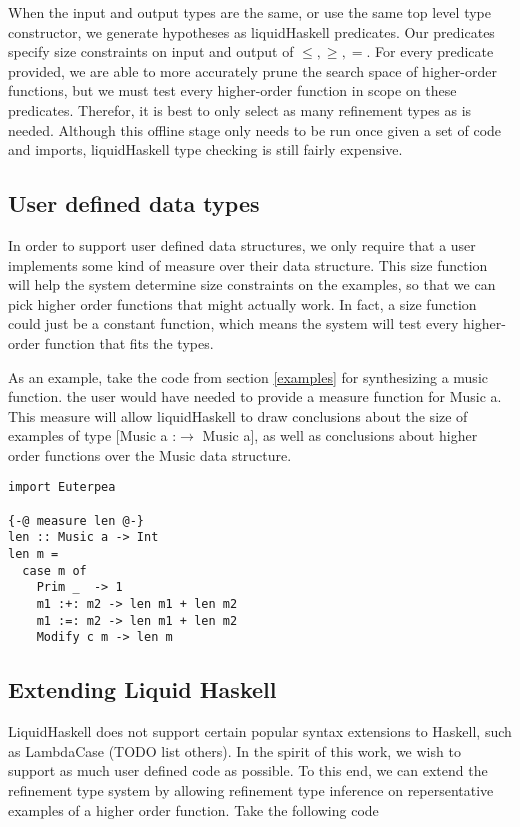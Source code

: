 When the input and output types are the same, or use the same top level type constructor, we generate hypotheses as liquidHaskell predicates.
Our predicates specify size constraints on input and output of $\leq,\geq,=$.
For every predicate provided, we are able to more accurately prune the search space of higher-order functions, but we must test every higher-order function in scope on these predicates. 
Therefor, it is best to only select as many refinement types as is needed.
Although this offline stage only needs to be run once given a set of code and imports, liquidHaskell type checking is still fairly expensive.



\subsection{User defined data types}
In order to support user defined data structures, we only require that a user implements some kind of measure\cite{realWorldLiquid} over their data structure.
This size function will help the system determine size constraints on the examples, so that we can pick higher order functions that might actually work.
In fact, a size function could just be a constant function, which means the system will test every higher-order function that fits the types. 

As an example, take the code from section \ref{examples} for synthesizing a music function.
the user would have needed to provide a measure function for Music a.
This measure will allow liquidHaskell to draw conclusions about the size of examples of type [Music a :$\to$ Music a], as well as conclusions about higher order functions over the Music data structure.

\begin{verbatim}
import Euterpea

{-@ measure len @-}
len :: Music a -> Int
len m =
  case m of
    Prim _  -> 1
    m1 :+: m2 -> len m1 + len m2
    m1 :=: m2 -> len m1 + len m2
    Modify c m -> len m
\end{verbatim}


\subsection{Extending Liquid Haskell}\label{extLiqHask}
LiquidHaskell does not support certain popular syntax extensions to Haskell, such as LambdaCase (TODO list others). In the spirit of this work, we wish to support as much user defined code as possible. To this end, we can extend the refinement type system by allowing refinement type inference on repersentative examples of a higher order function. Take the following code 

